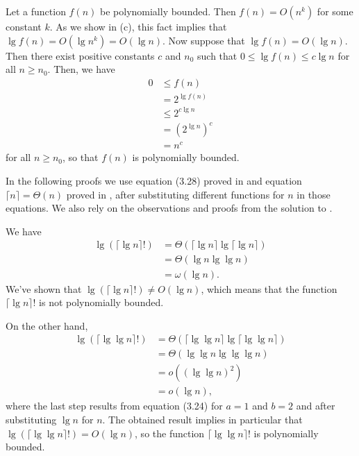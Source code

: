 \starred
Let a function $f(n)$ be polynomially bounded.
Then $f(n)=O(n^k)$ for some constant $k$.
As we show in (c), this fact implies that $\lg f(n)=O(\lg n^k)=O(\lg n)$.
Now suppose that $\lg f(n)=O(\lg n)$.
Then there exist positive constants $c$ and $n_0$ such that $0\le\lg f(n)\le c\lg n$ for all $n\ge n_0$.
Then, we have
\begin{align*}
    0 &\le f(n) \\
    &= 2^{\lg f(n)} \\
    &\le 2^{c\lg n} \\
    &= (2^{\lg n})^c \\
    &= n^c
\end{align*}
for all $n\ge n_0$, so that $f(n)$ is polynomially bounded.

In the following proofs we use equation (3.28) proved in  and equation $\lceil n\rceil=\Theta(n)$ proved in , after substituting different functions for $n$ in those equations.
We also rely on the observations and proofs from the solution to .

We have
\begin{align*}
    \lg(\lceil\lg n\rceil!) &= \Theta(\lceil\lg n\rceil\lg\lceil\lg n\rceil) \\
    &= \Theta(\lg n\lg\lg n) \\
    &= \omega(\lg n).
\end{align*}
We've shown that $\lg(\lceil\lg n\rceil!)\ne O(\lg n)$, which means that the function $\lceil\lg n\rceil!$ is not polynomially bounded.

On the other hand,
\begin{align*}
    \lg(\lceil\lg\lg n\rceil!) &= \Theta(\lceil\lg\lg n\rceil\lg\lceil\lg\lg n\rceil) \\
    &= \Theta(\lg\lg n\lg\lg\lg n) \\
    &= o((\lg\lg n)^2) \\
    &= o(\lg n),
\end{align*}
where the last step results from equation (3.24) for $a=1$ and $b=2$ and after substituting $\lg n$ for $n$.
The obtained result implies in particular that $\lg(\lceil\lg\lg n\rceil!)=O(\lg n)$, so the function $\lceil\lg\lg n\rceil!$ is polynomially bounded.

